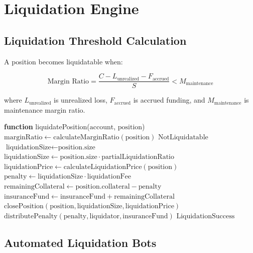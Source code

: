 \section{Liquidation Engine}


\subsection{Liquidation Threshold Calculation}

A position becomes liquidatable when:

\begin{equation}
\text{Margin Ratio} = \frac{C - L_{\text{unrealized}} - F_{\text{accrued}}}{S} < M_{\text{maintenance}}
\end{equation}

where $L_{\text{unrealized}}$ is unrealized loss, $F_{\text{accrued}}$ is accrued funding, and $M_{\text{maintenance}}$ is maintenance margin ratio.

\begin{algorithm}
\caption{Multi-Tier Liquidation Process}
\begin{algorithmic}[1]
\STATE \textbf{function} liquidatePosition($\text{account}$, $\text{position}$)
\STATE $\text{marginRatio} \gets \text{calculateMarginRatio}(\text{position})$
    \RETURN $\text{NotLiquidatable}$
\ENDIF
\STATE $\text{liquidationSize} \gets \text{position.size}$
    \STATE $\text{liquidationSize} \gets \text{position.size} \cdot \text{partialLiquidationRatio}$
\ENDIF
\STATE $\text{liquidationPrice} \gets \text{calculateLiquidationPrice}(\text{position})$
\STATE $\text{penalty} \gets \text{liquidationSize} \cdot \text{liquidationFee}$
\STATE $\text{remainingCollateral} \gets \text{position.collateral} - \text{penalty}$
    \STATE $\text{insuranceFund} \gets \text{insuranceFund} + \text{remainingCollateral}$
\ENDIF
\STATE $\text{closePosition}(\text{position}, \text{liquidationSize}, \text{liquidationPrice})$
\STATE $\text{distributePenalty}(\text{penalty}, \text{liquidator}, \text{insuranceFund})$
\RETURN $\text{LiquidationSuccess}$
\end{algorithmic}
\end{algorithm}

\subsection{Automated Liquidation Bots}

